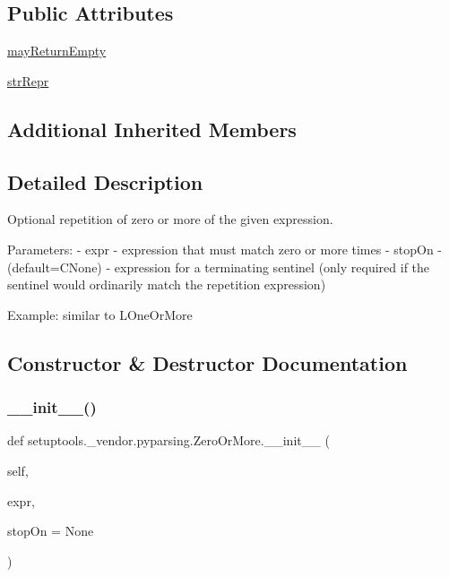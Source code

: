 \subsection*{Public Attributes}
\begin{DoxyCompactItemize}
\item 
\hyperlink{classsetuptools_1_1__vendor_1_1pyparsing_1_1ZeroOrMore_aeba31b21b849e5f0181b320eb47b799a}{may\+Return\+Empty}
\item 
\hyperlink{classsetuptools_1_1__vendor_1_1pyparsing_1_1ZeroOrMore_a73399f1a89d8c0a1fb0ca90319876095}{str\+Repr}
\end{DoxyCompactItemize}
\subsection*{Additional Inherited Members}


\subsection{Detailed Description}
\begin{DoxyVerb}Optional repetition of zero or more of the given expression.

Parameters:
 - expr - expression that must match zero or more times
 - stopOn - (default=C{None}) - expression for a terminating sentinel
      (only required if the sentinel would ordinarily match the repetition 
      expression)          

Example: similar to L{OneOrMore}
\end{DoxyVerb}
 

\subsection{Constructor \& Destructor Documentation}
\mbox{\label{classsetuptools_1_1__vendor_1_1pyparsing_1_1ZeroOrMore_a337db3762bba43f517e360a7d1ddd612}} 
\subsubsection{\texorpdfstring{\+\_\+\+\_\+init\+\_\+\+\_\+()}{\_\_init\_\_()}}
{\footnotesize\ttfamily def setuptools.\+\_\+vendor.\+pyparsing.\+Zero\+Or\+More.\+\_\+\+\_\+init\+\_\+\+\_\+ (\begin{DoxyParamCaption}\item[{}]{self,  }\item[{}]{expr,  }\item[{}]{stop\+On = {\ttfamily None} }\end{DoxyParamCaption})}



